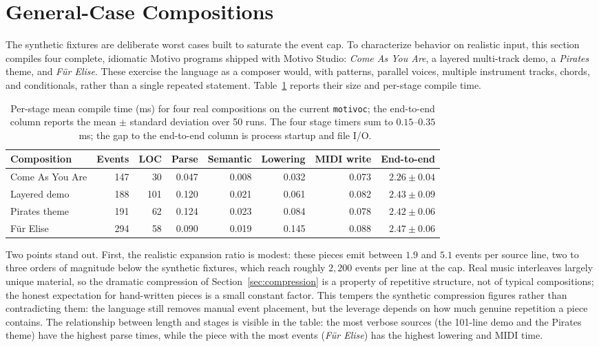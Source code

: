 \section{General-Case Compositions}\label{sec:general-case}

The synthetic fixtures are deliberate worst cases built to saturate the event cap.
To characterize behavior on realistic input, this section compiles four complete, idiomatic Motivo programs shipped with
Motivo Studio: \textit{Come As You Are}, a layered multi-track demo, a \textit{Pirates} theme, and \textit{F\"ur Elise}.
These exercise the language as a composer would, with patterns, parallel voices, multiple instrument tracks, chords, and
conditionals, rather than a single repeated statement.
Table~\ref{tab:general-case} reports their size and per-stage compile time.

\begin{table}[htbp]
  \centering
  \footnotesize
  \setlength{\tabcolsep}{4.5pt}
  \renewcommand{\arraystretch}{1.25}
  \begin{tabular}{lrrrrrrr}
    \toprule
    \textbf{Composition} & \textbf{Events} & \textbf{LOC} & \textbf{Parse} & \textbf{Semantic} & \textbf{Lowering} &
    \textbf{MIDI write} & \textbf{End-to-end} \\
    \midrule
    Come As You Are & 147 & 30  & 0.047 & 0.008 & 0.032 & 0.073 & $2.26 \pm 0.04$ \\
    Layered demo    & 188 & 101 & 0.120 & 0.021 & 0.061 & 0.082 & $2.43 \pm 0.09$ \\
    Pirates theme   & 191 & 62  & 0.124 & 0.023 & 0.084 & 0.078 & $2.42 \pm 0.06$ \\
    F\"ur Elise     & 294 & 58  & 0.090 & 0.019 & 0.145 & 0.088 & $2.47 \pm 0.06$ \\
    \bottomrule
  \end{tabular}
  \caption{Per-stage mean compile time (ms) for four real compositions on the current \texttt{motivoc}; the end-to-end
    column reports the mean $\pm$ standard deviation over 50 runs. The four stage timers sum to $0.15$--$0.35$~ms; the
  gap to the end-to-end column is process startup and file I/O.}\label{tab:general-case}
\end{table}

Two points stand out.
First, the realistic expansion ratio is modest: these pieces emit between $1.9$ and $5.1$ events per source line, two to
three orders of magnitude below the synthetic fixtures, which reach roughly $2{,}200$ events per line at the cap.
Real music interleaves largely unique material, so the dramatic compression of Section~\ref{sec:compression} is a
property of repetitive structure, not of typical compositions; the honest expectation for hand-written pieces is a small
constant factor.
This tempers the synthetic compression figures rather than contradicting them: the language still removes manual event
placement, but the leverage depends on how much genuine repetition a piece contains.
The relationship between length and stages is visible in the table: the most verbose sources (the 101-line demo and the
Pirates theme) have the highest parse times, while the piece with the most events (\textit{F\"ur Elise}) has the highest
lowering and MIDI time.

